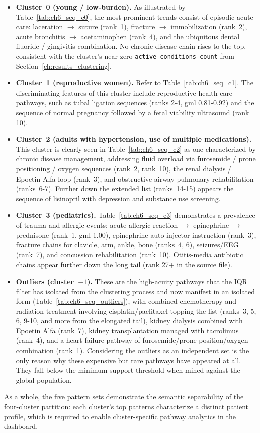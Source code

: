 \begin{itemize}
    \item \textbf{Cluster~0 (young / low-burden).} As illustrated by Table~\ref{tab:ch6_seq_c0}, the most prominent trends consist of episodic acute care: laceration $\rightarrow$ suture (rank~1), fracture $\rightarrow$ immobilization (rank~2), acute bronchitis $\rightarrow$ acetaminophen (rank~4), and the ubiquitous dental fluoride / gingivitis combination. No chronic-disease chain rises to the top, consistent with the cluster's near-zero \texttt{active\_conditions\_count} from Section~\ref{ch:results_clustering}.

    \item \textbf{Cluster~1 (reproductive women).} Refer to Table~\ref{tab:ch6_seq_c1}. The discriminating features of this cluster include reproductive health care pathways, such as tubal ligation sequences (ranks 2-4, gml 0.81-0.92) and the sequence of normal pregnancy followed by a fetal viability ultrasound (rank 10).

    \item \textbf{Cluster~2 (adults with hypertension, use of multiple medications).} This cluster is clearly seen in Table~\ref{tab:ch6_seq_c2} as one characterized by chronic disease management, addressing fluid overload via furosemide / prone positioning / oxygen sequences (rank~2, rank~10), the renal dialysis / Epoetin Alfa loop (rank~3), and obstructive airway pulmonary rehabilitation (ranks~6-7). Further down the extended list (ranks~14-15) appears the sequence of lisinopril with depression and substance use screening.

    \item \textbf{Cluster~3 (pediatrics).} Table~\ref{tab:ch6_seq_c3} demonstrates a prevalence of trauma and allergic events: acute allergic reaction $\rightarrow$ epinephrine $\rightarrow$ prednisone (rank~1, gml 1.00), epinephrine auto-injector instruction (rank~3), fracture chains for clavicle, arm, ankle, bone (ranks~4, 6), seizures/EEG (rank~7), and concussion rehabilitation (rank~10). Otitis-media antibiotic chains appear further down the long tail (rank 27+ in the source file).

    \item \textbf{Outliers (cluster~$-1$).} These are the high-acuity pathways that the IQR filter has isolated from the clustering process and now manifest in an isolated form (Table~\ref{tab:ch6_seq_outliers}), with combined chemotherapy and radiation treatment involving cisplatin/paclitaxel topping the list (ranks~3, 5, 6, 9-10, and more from the elongated tail), kidney dialysis combined with Epoetin Alfa (rank~7), kidney transplantation managed with tacrolimus (rank~4), and a heart-failure pathway of furosemide/prone position/oxygen combination (rank~1). Considering the outliers as an independent set is the only reason why these expensive but rare pathways have appeared at all. They fall below the minimum-support threshold when mined against the global population.
\end{itemize}

\vspace{1em}
As a whole, the five pattern sets demonstrate the semantic separability of the four-cluster partition: each cluster’s top patterns characterize a distinct patient profile, which is required to enable cluster-specific pathway analytics in the dashboard.